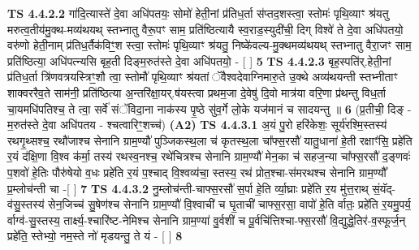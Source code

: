 \documentclass[17pt]{extarticle}
\begin{document}
                  \newline
                                \textbf{ TS 4.4.2.2} \newline
                  गा॑दि॒त्यास्ते॑ दे॒वा अधि॑पतयः॒ सोमो॑ हेती॒नां प्र॑तिध॒र्ता स॑प्तद॒शस्त्वा॒ स्तोमः॑ पृथि॒व्याꣳ श्र॑यतु मरुत्व॒तीय॑मु॒क्थ-मव्य॑थयथ् स्तभ्नातु वैरू॒पꣳ साम॒ प्रति॑ष्ठित्यायै स्व॒राड॒स्युदी॑ची॒ दिग् विश्वे॑ ते दे॒वा अधि॑पतयो॒ वरु॑णो हेती॒नाम् प्र॑तिध॒र्तैक॑विꣳ॒॒श स्त्वा॒ स्तोमः॑ पृथि॒व्याꣳ श्र॑यतु॒ निष्के॑वल्य-मु॒क्थमव्य॑थयथ् स्तभ्नातु वैरा॒जꣳ साम॒ प्रति॑ष्ठित्या॒ अधि॑पत्न्यसि बृह॒ती दिङ्म॒रुत॑स्ते दे॒वा अधि॑पतयो॒ - [  ] \textbf{  5} \newline
                  \newline
                                \textbf{ TS 4.4.2.3} \newline
                  बृह॒स्पति॑र्.हेती॒नां प्र॑तिध॒र्ता त्रि॑णवत्रयस्त्रिꣳ॒॒शौ त्वा॒ स्तोमौ॑ पृथि॒व्याꣳ श्र॑यतां ॅवैश्वदेवाग्निमारु॒ते उ॒क्थे अव्य॑थयन्ती स्तभ्नीताꣳ शाक्वररैव॒ते साम॑नी॒ प्रति॑ष्ठित्या अ॒न्तरि॑क्षा॒यर्.ष॑यस्त्वा प्रथम॒जा दे॒वेषु॑ दि॒वो मात्र॑या वरि॒णा प्र॑थन्तु विध॒र्ता चा॒यमधि॑पतिश्च॒ ते त्वा॒ सर्वे॑ संॅविदा॒ना नाक॑स्य पृ॒ष्ठे सु॑व॒र्गे लो॒के यज॑मानं च सादयन्तु ॥ \textbf{  6 } \newline
                  \newline
                      (प्र॒तीची॒ दिङ् - म॒रुत॑स्ते दे॒वा अधि॑पतय - श्चत्वारिꣳ॒॒शच्च॑)  \textbf{(A2)} \newline \newline
                                        \textbf{ TS 4.4.3.1} \newline
                  अ॒यं पु॒रो हरि॑केशः॒ सूर्य॑रश्मि॒स्तस्य॑ रथगृ॒थ्सश्च॒ रथौ॑जाश्च सेनानि ग्राम॒ण्यौ॑ पुञ्जिकस्थ॒ला च॑ कृतस्थ॒ला चा᳚फ्स॒रसौ॑ यातु॒धाना॑ हे॒ती रक्षाꣳ॑सि॒ प्रहे॑ति र॒यं द॑क्षि॒णा वि॒श्व क॑र्मा॒ तस्य॑ रथस्व॒नश्च॒ रथे॑चित्रश्च सेनानि ग्राम॒ण्यौ॑ मेन॒का च॑ सहज॒न्या चा᳚फ्स॒रसौ॑ द॒ङ्णवः॑ प॒शवो॑ हे॒तिः पौरु॑षेयो व॒धः प्रहे॑ति र॒यं प॒श्चाद् वि॒श्वव्य॑चा॒ स्तस्य॒ रथ॑ प्रोत॒श्चा-स॑मरथश्च सेनानि ग्राम॒ण्यौ᳚ प्र॒म्लोच॑न्ती चा -[  ] \textbf{  7} \newline
                  \newline
                                \textbf{ TS 4.4.3.2} \newline
                  नु॒म्लोच॑न्ती-चाफ्स॒रसौ॑ स॒र्पा हे॒ति र्व्या॒घ्राः प्रहे॑ति र॒य मु॑त्त॒राथ् सं॒यॅद्- व॑सु॒स्तस्य॑ सेन॒जिच्च॑ सु॒षेण॑श्च सेनानि ग्राम॒ण्यौ॑ वि॒श्वाची॑ च घृ॒ताची॑ चाफ्स॒रसा॒ वापो॑ हे॒ति र्वातः॒ प्रहे॑ति र॒यमु॒पर्य॒ र्वाग्व॑-सु॒स्तस्य॒ तार्क्ष्य॒-श्चारि॑ष्ट-नेमिश्च सेनानि ग्राम॒ण्या॑ वु॒र्वशी॑ च पू॒र्वचि॑त्तिश्चा-फ्स॒रसौ॑ वि॒द्युद्धे॒तिर॑-व॒स्फूर्ज॒न् प्रहे॑ति॒ स्तेभ्यो॒ नम॒स्ते नो॑ मृडयन्तु॒ ते यं - [  ] \textbf{  8} \newline
\end{document}
